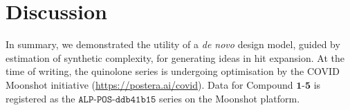 \section{Discussion} \label{sec:discussion}

In summary, we demonstrated the utility of a \emph{de novo} design model, guided by estimation of synthetic complexity, for generating ideas in hit expansion. At the time of writing, the quinolone series is undergoing optimisation by the COVID Moonshot initiative (\url{https://postera.ai/covid}). Data for Compound $\mathbf{1}$-$\mathbf{5}$ is registered as the $\texttt{ALP-POS-ddb41b15}$ series on the Moonshot platform. 



